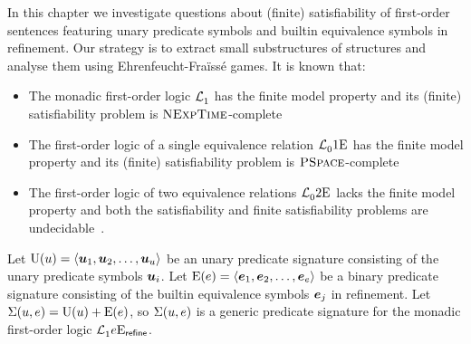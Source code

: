 
In this chapter we investigate questions about (finite) satisfiability of
first-order sentences featuring unary predicate symbols and builtin equivalence
symbols in refinement.
Our strategy is to extract small substructures of structures and analyse them
using Ehrenfeucht-Fra\"{i}ss\'{e} games.
It is known that:
\begin{itemize}
  \item The monadic first-order logic $\mathcal{L}^{{}}_{1}$ has the finite model
  property and its (finite) satisfiability problem is
  $\text{\normalfont{\scshape NExpTime}}$-complete~\cite{Lowenheim1915}
  \item The first-order logic of a single equivalence relation
  $\mathcal{L}^{{}}_{0}{1}\mathrm{E}_{{}}$ has the finite model property and its (finite)
  satisfiability problem is $\text{\normalfont{\scshape PSpace}}$-complete~\cite{boerger1997classical}
  \item The first-order logic of two equivalence relations
  $\mathcal{L}^{{}}_{0}{2}\mathrm{E}_{{}}$ lacks the finite model property and both the
  satisfiability and finite satisfiability problems are
  undecidable~\cite{Janiczak1953}.
\end{itemize}
Let $\mathrm{U}(u) = \left\langle \bm{u}_{1},\bm{u}_{2},\dots,\bm{u}_{u} \right\rangle$ be an unary predicate
signature consisting of the unary predicate symbols $\bm{u}_{i}$.
Let $\mathrm{E}(e) = \left\langle \bm{e}_{1},\bm{e}_{2},\dots,\bm{e}_{e} \right\rangle$ be a binary predicate
signature consisting of the builtin equivalence symbols $\bm{e}_{j}$ in refinement.
Let $\mathrm{\Sigma}(u,e) = \mathrm{U}(u) + \mathrm{E}(e)$, so $\mathrm{\Sigma}(u,e)$ is a generic
predicate signature for the monadic first-order logic
$\mathcal{L}^{{}}_{1}{e}\mathrm{E}_{\mathsf{refine}}$.